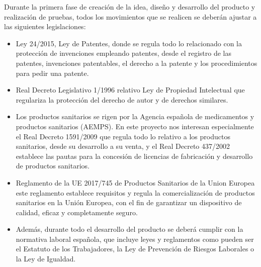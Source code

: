 Durante la primera fase de creación de la idea, diseño y desarrollo del producto y realización de pruebas, todos los movimientos que se realicen se deberán ajustar a las siguientes legislaciones:
\begin{itemize}
    \item Ley 24/2015\cite{patentes}, Ley de Patentes, donde se regula todo lo relacionado con la protección de invenciones empleando patentes, desde el registro de las patentes, invenciones patentables, el derecho a la patente y los procedimientos para pedir una patente.
    
    \item Real Decreto Legislativo 1/1996\cite{PropIntelectual} relativo Ley de Propiedad Intelectual que regulariza la protección del derecho de autor y de derechos similares.
    
    \item Los productos sanitarios se rigen por la Agencia española de medicamentos y productos sanitarios (AEMPS)\cite{AEMPS}. En este proyecto nos interesan especialmente el Real Decreto 1591/2009\cite{prodSanitario1} que regula todo lo relativo a los productos sanitarios, desde su desarrollo a su venta, y el Real Decreto 437/2002\cite{prodSanitario2} establece las pautas para la concesión de licencias de fabricación y desarrollo de productos sanitarios.
    
    \item Reglamento de la UE 2017/745\cite{ProdSanitariosEU} de Productos Sanitarios de la Union Europea este reglamento establece requisitos y regula la comercialización de productos sanitarios en la Unión Europea, con el fin de garantizar un dispositivo de calidad, eficaz y completamente seguro.
    
    \item Además, durante todo el desarrollo del producto se deberá cumplir con la normativa laboral española\cite{normaLaboral}, que incluye leyes y reglamentos como pueden ser el Estatuto de los Trabajadores, la Ley de Prevención de Riesgos Laborales o la Ley de Igualdad.
    
\end{itemize}


